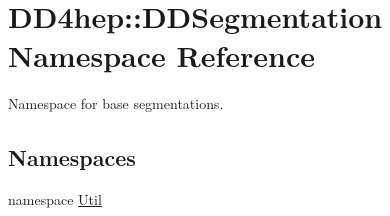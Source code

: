 \hypertarget{namespace_d_d4hep_1_1_d_d_segmentation}{
\section{DD4hep::DDSegmentation Namespace Reference}
\label{namespace_d_d4hep_1_1_d_d_segmentation}
}


Namespace for base segmentations.  
\subsection*{Namespaces}
\begin{DoxyCompactItemize}
\item 
namespace \hyperlink{namespace_d_d4hep_1_1_d_d_segmentation_1_1_util}{Util}
\end{DoxyCompactItemize}
